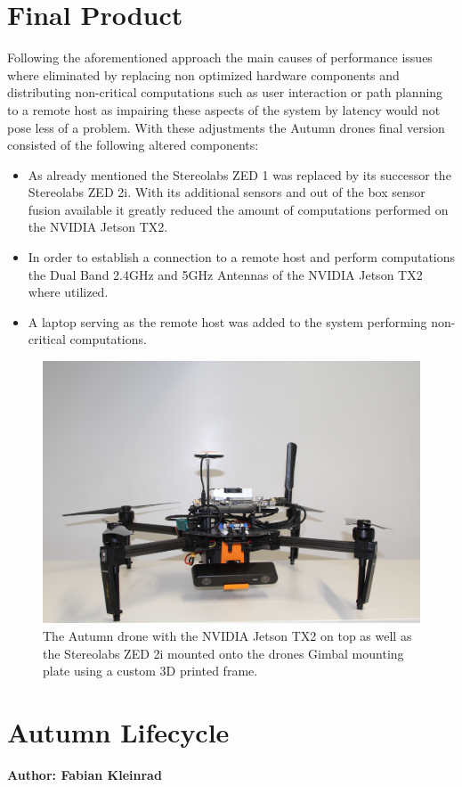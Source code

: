 \section{Final Product}
Following the aforementioned approach the main causes of performance issues where eliminated by replacing non optimized hardware components and distributing non-critical computations such as user interaction or path planning to a remote host as impairing these aspects of the system by latency would not pose less of a problem. 
With these adjustments the Autumn drones final version consisted of the following altered components:
\begin{itemize}
	\item As already mentioned the Stereolabs ZED 1 was replaced by its successor the Stereolabs ZED 2i. With its additional sensors and out of the box sensor fusion available it greatly reduced the amount of computations performed on the NVIDIA Jetson TX2. 
	\item In order to establish a connection to a remote host and perform computations the Dual Band 2.4GHz and 5GHz Antennas of the NVIDIA Jetson TX2 where utilized. 
	\item A laptop serving as the remote host was added to the system performing non-critical computations.
\end{itemize}

\begin{figure}
	\centering
	\includegraphics[width=0.9\linewidth]{img/autumnDrone}
	\caption{
		The Autumn drone with the NVIDIA Jetson TX2 on top as well as the Stereolabs ZED 2i mounted onto the drones Gimbal mounting plate using a custom 3D printed frame. 
	}
	\label{fig:autumn}
\end{figure}


\section{Autumn Lifecycle}
\textbf{Author: Fabian Kleinrad} 


\filbreak